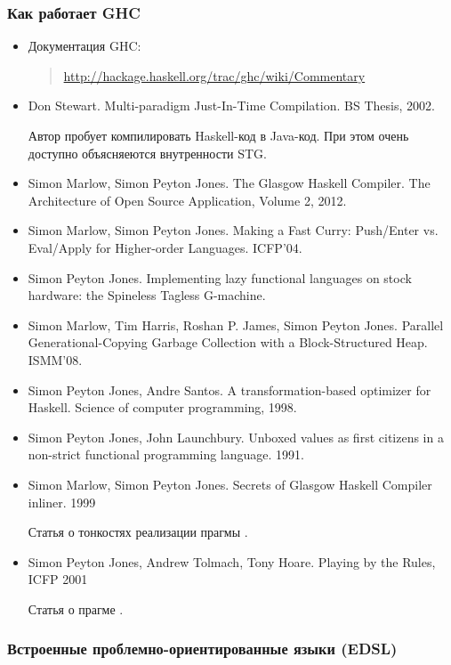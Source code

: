 \subsubsection{Как работает GHC}

\begin{itemize}
\item
  Документация GHC:

  \begin{quote}
  \url{http://hackage.haskell.org/trac/ghc/wiki/Commentary}
  \end{quote}
\item
  Don Stewart. Multi-paradigm Just-In-Time Compilation. BS Thesis, 2002.

  Автор пробует компилировать Haskell-код в Java-код. При этом очень
  доступно объясняеются внутренности STG.
\item
  Simon Marlow, Simon Peyton Jones. The Glasgow Haskell Compiler. The
  Architecture of Open Source Application, Volume 2, 2012.
\item
  Simon Marlow, Simon Peyton Jones. Making a Fast Curry: Push/Enter vs.
  Eval/Apply for Higher-order Languages. ICFP'04.
\item
  Simon Peyton Jones. Implementing lazy functional languages on stock
  hardware: the Spineless Tagless G-machine.
\item
  Simon Marlow, Tim Harris, Roshan P. James, Simon Peyton Jones.
  Parallel Generational-Copying Garbage Collection with a
  Block-Structured Heap. ISMM'08.
\item
  Simon Peyton Jones, Andre Santos. A transformation-based optimizer for
  Haskell. Science of computer programming, 1998.
\item
  Simon Peyton Jones, John Launchbury. Unboxed values as first citizens
  in a non-strict functional programming language. 1991.
\item
  Simon Marlow, Simon Peyton Jones. Secrets of Glasgow Haskell Compiler
  inliner. 1999

  Статья о тонкостях реализации прагмы .
\item
  Simon Peyton Jones, Andrew Tolmach, Tony Hoare. Playing by the Rules,
  ICFP 2001

  Статья о прагме .
\end{itemize}

\subsubsection{Встроенные проблемно-ориентированные языки (EDSL)}

